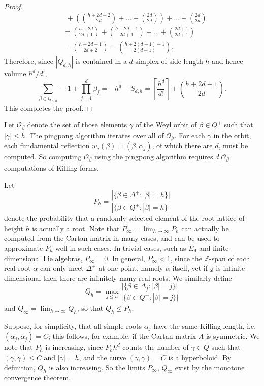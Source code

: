 \documentclass[12pt]{article}
\newcommand{\ZZ}{\mathbb{Z}}
\theoremstyle{definition}
\begin{document}
\begin{proof}
\begin{align*}
    &~~+ \left(\binom{h+2d-2}{2d} + \dots + \binom{2d}{2d}\right) + \dots + \binom{2d}{2d}\\
    &= \binom{h+2d}{2d+1} + \binom{h+2d-1}{2d+1} + \dots + \binom{2d+1}{2d+1}\\
    &= \binom{h+2d+1}{2d+2} = \binom{h+2(d+1) - 1}{2(d+1)}.
\end{align*}
    Therefore, since $|Q_{d,h}|$ is contained in a $d$-simplex of side length $h$ and hence volume $h^d/d!$,
    $$\sum_{\beta \in Q_{d,h}} -1 + \prod_{j=1}^d \beta_j = -h^d + S_{d,h} = \left\lceil \frac{h^d}{d!}\right\rceil + \binom{h+2d-1}{2d}.$$
    This completes the proof.
\end{proof}

Let $\mathcal O_\beta$ denote the set of those elements $\gamma$ of the Weyl orbit of $\beta \in Q^+$ such that $|\gamma| \leq h$. The pingpong algorithm iterates over all of $\mathcal O_\beta$. For each $\gamma$ in the orbit, each fundamental reflection $w_j(\beta) = (\beta, \alpha_j)$, of which there are $d$, must be computed. So computing $\mathcal O_\beta$ using the pingpong algorithm requires $d|\mathcal O_\beta|$ computations of Killing forms.

Let
$$P_h = \frac{|\{\beta \in \Delta^+: |\beta| = h\}|}{|\{\beta \in Q^+: |\beta| = h\}|}$$
denote the probability that a randomly selected element of the root lattice of height $h$ is actually a root. Note that $P_\infty = \lim_{h \to \infty} P_h$ can actually be computed from the Cartan matrix in many cases, and can be used to approximate $P_h$ well in such cases. In trivial cases, such as $E_9$ and finite-dimensional Lie algebras, $P_\infty = 0$. In general, $P_\infty < 1$, since the $\ZZ$-span of each real root $\alpha$ can only meet $\Delta^+$ at one point, namely $\alpha$ itself, yet if $\mathfrak g$ is infinite-dimensional then there are infinitely many real roots. We similarly define
$$Q_h = \max_{j \leq h} \frac{|\{\beta \in \Delta_f: |\beta| = j\}|}{|\{\beta \in Q^+: |\beta| = j\}|}$$
and $Q_\infty = \lim_{h \to \infty} Q_h$, so that $Q_h \leq P_h$.

Suppose, for simplicity, that all simple roots $\alpha_j$ have the same Killing length, i.e. $(\alpha_j, \alpha_j) = C$; this follows, for example, if the Cartan matrix $A$ is symmetric. We note that $P_h$ is increasing, since $P_hh^d$ counts the number of $\gamma \in Q$ such that $(\gamma, \gamma) \leq C$ and $|\gamma| = h$, and the curve $(\gamma, \gamma) = C$ is a hyperboloid. By definition, $Q_h$ is also increasing. So the limits $P_\infty$, $Q_\infty$ exist by the monotone convergence theorem.
\end{document}
